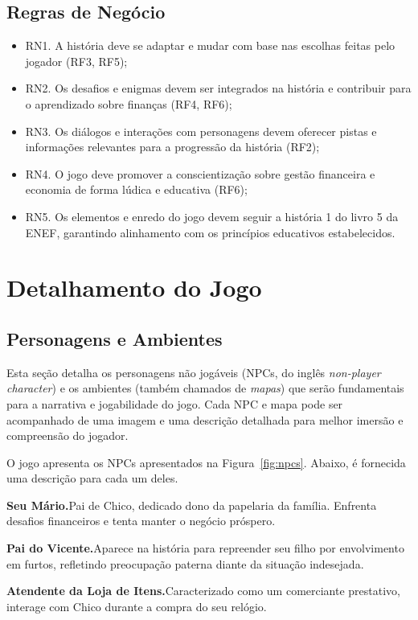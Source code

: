 \subsection*{Regras de Negócio}
\begin{itemize}
	\item RN1. A história deve se adaptar e mudar com base nas escolhas feitas pelo jogador (RF3, RF5);
	\item RN2. Os desafios e enigmas devem ser integrados na história e contribuir para o aprendizado sobre finanças (RF4, RF6);
	\item RN3. Os diálogos e interações com personagens devem oferecer pistas e informações relevantes para a progressão da história (RF2);
	\item RN4. O jogo deve promover a conscientização sobre gestão financeira e economia de forma lúdica e educativa (RF6);
	\item RN5. Os elementos e enredo do jogo devem seguir a história 1 do livro 5 da ENEF, garantindo alinhamento com os princípios educativos estabelecidos.
\end{itemize}

\section{Detalhamento do Jogo}

\subsection{Personagens e Ambientes}
Esta seção detalha os personagens não jogáveis (NPCs, do inglês \textit{non-player character}) e os ambientes (também chamados de \textit{mapas}) que serão fundamentais para a narrativa e jogabilidade do jogo. Cada NPC e mapa pode ser acompanhado de uma imagem e uma descrição detalhada para melhor imersão e compreensão do jogador.

O jogo apresenta os NPCs apresentados na Figura~\ref{fig:npcs}. Abaixo, é fornecida uma descrição para cada um deles.

\medskip\noindent \textbf{Seu Mário.}\quad Pai de Chico, dedicado dono da papelaria da família. Enfrenta desafios financeiros e tenta manter o negócio próspero.

\medskip\noindent \textbf{Pai do Vicente.}\quad Aparece na história para repreender seu filho por envolvimento em furtos, refletindo preocupação paterna diante da situação indesejada.

\medskip\noindent \textbf{Atendente da Loja de Itens.}\quad Caracterizado como um comerciante prestativo, interage com Chico durante a compra do seu relógio.

